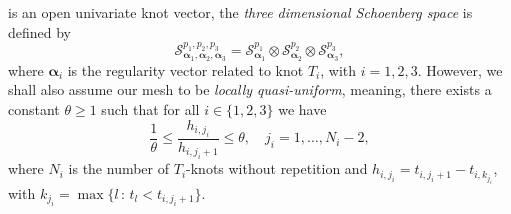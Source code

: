 is an open univariate knot vector, the {\em three dimensional  Schoenberg space} is defined by 
\begin{equation*}
\bm{\mathcal{S}}^{p_1,p_2,p_3}_{\bm{\alpha}_1,\bm{\alpha}_2,\bm{\alpha}_3}= \mathcal{S}^{p_1}_{\bm{\alpha}_1} \otimes \mathcal{S}^{p_2}_{\bm{\alpha}_2} \otimes \mathcal{S}^{p_3}_{\bm{\alpha}_3},
\end{equation*} 
where $\bm{\alpha}_i$ is the regularity vector related to knot $T_i$, with $i=1,2,3$. However, we shall also assume our mesh to be {\em locally quasi-uniform}, meaning, there exists a constant $\theta \geq 1$ such that for all $i\in \{1,2,3\}$ we have 
\begin{equation*}
\frac{1}{\theta} \leq \frac{h_{i,j_i}}{h_{i,j_i+1}} \leq \theta, \quad j_i=1, \ldots, N_i-2,
\end{equation*}
where $N_i$ is the number of $T_i$-knots without repetition and $h_{i,j_i}=t_{i,j_i+1}-t_{i,k_{j_i}}$, with $k_{j_i}=\max \{l\,:\,t_l < t_{i,j_i+1}\}$.

